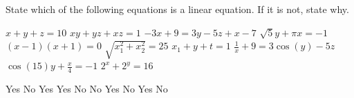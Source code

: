

\begin{Exercise}[
name={},
title={}, 
difficulty=0,
origin={\cite{GH}}]
State which of the following equations is a linear equation. If it is not, state why.
\begin{multicols}{2}
\Question $x+y+z = 10$
\Question $xy + yz+ xz = 1$
\Question $-3x + 9 = 3y - 5z+ x-7$
\Question $\sqrt{5}y + \pi x =-1$
\Question $(x-1)(x+1) = 0$
\Question $\sqrt{x_1^2+x_2^2} = 25$
\Question $x_1 + y + t = 1$
\Question $\frac{1}{x} + 9 = 3\cos(y) - 5z$
\Question $\cos(15)y + \frac{x}{4} =-1$
\Question $2^x + 2^y = 16$
\EndCurrentQuestion
\end{multicols}
\end{Exercise}

\begin{Answer}
\Question Yes
\Question No
\Question Yes
\Question Yes
\Question No
\Question No
\Question Yes
\Question No
\Question Yes
\Question No
\end{Answer}
